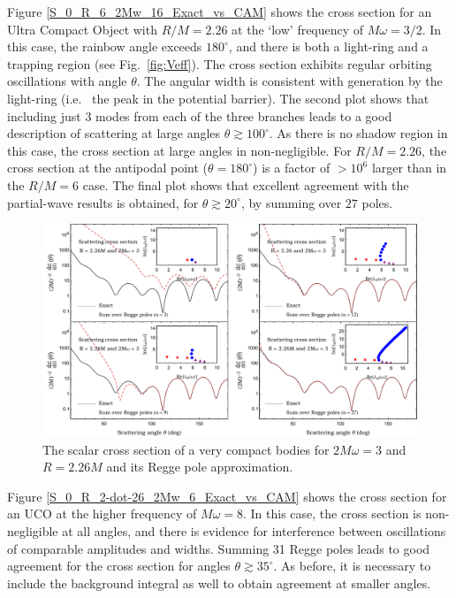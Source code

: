 \documentclass[aps,prd,longbibliography,reprint,twocolumn,amsmath,amssymb,amsfonts,showpacs,superscriptaddress]{revtex4-1}%
\begin{document}
Figure \ref{S_0_R_6_2Mw_16_Exact_vs_CAM} shows the cross section for an Ultra Compact Object with $R/M = 2.26$ at the `low' frequency of $M \omega = 3/2$. In this case, the rainbow angle exceeds $180^\circ$, and there is both a light-ring and a trapping region (see Fig.~\ref{fig:Veff}). The cross section exhibits regular orbiting oscillations with angle $\theta$. The angular width is consistent with generation by the light-ring (i.e.~ the peak in the potential barrier). The second plot shows that including just 3 modes from each of the three branches leads to a good description of scattering at large angles $\theta \gtrsim 100^\circ$. As there is no shadow region in this case, the cross section at large angles in non-negligible. For $R/M = 2.26$, the cross section at the antipodal point ($\theta = 180^\circ$) is a factor of $> 10^6$ larger than in the $R/M = 6$ case. The final plot shows that excellent agreement with the partial-wave results is obtained, for $\theta \gtrsim 20^\circ$, by summing over $27$ poles.

\begin{figure}%
\centering
 \includegraphics[scale=0.50]{Scattering_Cross_Section_R_2-dot-26_2Mw_3}
\caption{\label{S_0_R_2-dot-26_2Mw_3_Exact_vs_CAM} The scalar cross section of a very compact bodies for $2M\omega=3$ and $R=2.26M$ and its Regge pole approximation.}
\end{figure}

Figure \ref{S_0_R_2-dot-26_2Mw_6_Exact_vs_CAM} shows the cross section for an UCO at the higher frequency of $M \omega = 8$. In this case, the cross section is non-negligible at all angles, and there is evidence for interference between oscillations of comparable amplitudes and widths. Summing 31 Regge poles leads to good agreement for the cross section for angles $\theta \gtrsim 35^\circ$. As before, it is necessary to include the background integral as well to obtain agreement at smaller angles.
\end{document}
